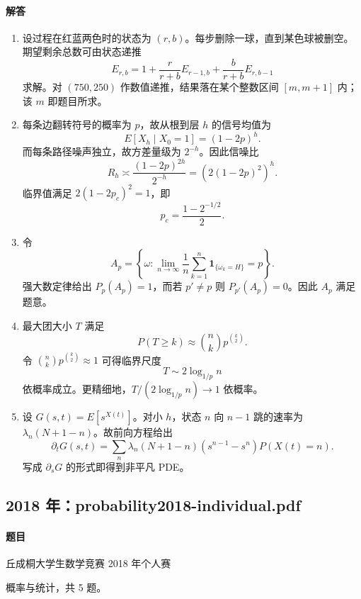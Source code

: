 \documentclass[UTF8,12pt]{ctexart}
\begin{document}
\paragraph{解答}
\begin{enumerate}[label=\textbf{\arabic*.},leftmargin=2.2em]
\item 设过程在红蓝两色时的状态为 \((r,b)\)。每步删除一球，直到某色球被删空。期望剩余总数可由状态递推
\[
E_{r,b}=1+\frac{r}{r+b}E_{r-1,b}+\frac{b}{r+b}E_{r,b-1}
\]
求解。对 \((750,250)\) 作数值递推，结果落在某个整数区间 \([m,m+1]\) 内；该 \(m\) 即题目所求。

\item 每条边翻转符号的概率为 \(p\)，故从根到层 \(h\) 的信号均值为
\[
E[X_h\mid X_0=1]=(1-2p)^h.
\]
而每条路径噪声独立，故方差量级为 \(2^{-h}\)。因此信噪比
\[
R_h\asymp \frac{(1-2p)^{2h}}{2^{-h}}=(2(1-2p)^2)^h.
\]
临界值满足 \(2(1-2p_c)^2=1\)，即
\[
p_c=\frac{1-2^{-1/2}}2.
\]

\item 令
\[
A_p=\left\{\omega:\lim_{n\to\infty}\frac1n\sum_{k=1}^n \mathbf1_{\{\omega_k=H\}}=p\right\}.
\]
强大数定律给出 \(P_p(A_p)=1\)，而若 \(p'\ne p\) 则 \(P_{p'}(A_p)=0\)。因此 \(A_p\) 满足题意。

\item 最大团大小 \(T\) 满足
\[
P(T\ge k)\approx \binom{n}{k}p^{\binom{k}{2}}.
\]
令 \(\binom{n}{k}p^{\binom{k}{2}}\approx1\) 可得临界尺度
\[
T\sim 2\log_{1/p}n
\]
依概率成立。更精细地，\(T/(2\log_{1/p}n)\to1\) 依概率。

\item 设 \(G(s,t)=E[s^{X(t)}]\)。对小 \(h\)，状态 \(n\) 向 \(n-1\) 跳的速率为 \(\lambda_n(N+1-n)\)。故前向方程给出
\[
\partial_t G(s,t)=\sum_n \lambda_n(N+1-n)(s^{n-1}-s^n)P(X(t)=n).
\]
写成 \(\partial_s G\) 的形式即得到非平凡 PDE。
\end{enumerate}

\subsection{2018 年：probability2018-individual.pdf}
\paragraph{题目}
丘成桐大学生数学竞赛 2018 年个人赛

概率与统计，共 5 题。
\end{document}
